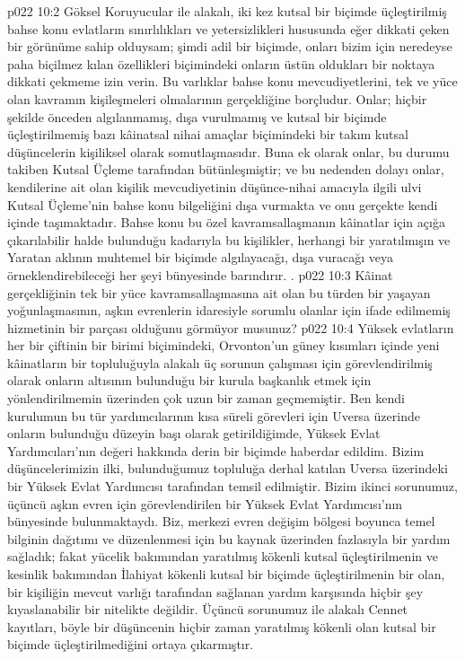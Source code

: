 \vs p022 10:2 Göksel Koruyucular ile alakalı, iki kez kutsal bir biçimde üçleştirilmiş bahse konu evlatların sınırlılıkları ve yetersizlikleri hususunda eğer dikkati çeken bir görünüme sahip olduysam; şimdi adil bir biçimde, onları bizim için neredeyse paha biçilmez kılan özellikleri biçimindeki onların üstün oldukları bir noktaya dikkati çekmeme izin verin. Bu varlıklar bahse konu mevcudiyetlerini, tek ve yüce olan kavramın kişileşmeleri olmalarının gerçekliğine borçludur. Onlar; hiçbir şekilde önceden algılanmamış, dışa vurulmamış ve kutsal bir biçimde üçleştirilmemiş bazı kâinatsal nihai amaçlar biçimindeki bir takım kutsal düşüncelerin kişiliksel olarak somutlaşmasıdır. Buna ek olarak onlar, bu durumu takiben Kutsal Üçleme tarafından bütünleşmiştir; ve bu nedenden dolayı onlar, kendilerine ait olan kişilik mevcudiyetinin düşünce\hyp{}nihai amacıyla ilgili ulvi Kutsal Üçleme’nin bahse konu bilgeliğini dışa vurmakta ve onu gerçekte kendi içinde taşımaktadır. Bahse konu bu özel kavramsallaşmanın kâinatlar için açığa çıkarılabilir halde bulunduğu kadarıyla bu kişilikler, herhangi bir yaratılmışın ve Yaratan aklının muhtemel bir biçimde algılayacağı, dışa vuracağı veya örneklendirebileceği her şeyi bünyesinde barındırır. .
\vs p022 10:3 Kâinat gerçekliğinin tek bir yüce kavramsallaşmasına ait olan bu türden bir yaşayan yoğunlaşmasının, aşkın evrenlerin idaresiyle sorumlu olanlar için ifade edilmemiş hizmetinin bir parçası olduğunu görmüyor musunuz?
\vs p022 10:4 Yüksek evlatların her bir çiftinin bir birimi biçimindeki, Orvonton’un güney kısımları içinde yeni kâinatların bir topluluğuyla alakalı üç sorunun çalışması için görevlendirilmiş olarak onların altısının bulunduğu bir kurula başkanlık etmek için yönlendirilmemin üzerinden çok uzun bir zaman geçmemiştir. Ben kendi kurulumun bu tür yardımcılarının kısa süreli görevleri için Uversa üzerinde onların bulunduğu düzeyin başı olarak getirildiğimde, Yüksek Evlat Yardımcıları’nın değeri hakkında derin bir biçimde haberdar edildim. Bizim düşüncelerimizin ilki, bulunduğumuz topluluğa derhal katılan Uversa üzerindeki bir Yüksek Evlat Yardımcısı tarafından temsil edilmiştir. Bizim ikinci sorunumuz, üçüncü aşkın evren için görevlendirilen bir Yüksek Evlat Yardımcısı’nın bünyesinde bulunmaktaydı. Biz, merkezi evren değişim bölgesi boyunca temel bilginin dağıtımı ve düzenlenmesi için bu kaynak üzerinden fazlasıyla bir yardım sağladık; fakat yücelik bakımından yaratılmış kökenli kutsal üçleştirilmenin ve kesinlik bakımından İlahiyat kökenli kutsal bir biçimde üçleştirilmenin bir  olan, bir kişiliğin mevcut varlığı tarafından sağlanan yardım karşısında hiçbir şey kıyaslanabilir bir nitelikte değildir. Üçüncü sorunumuz ile alakalı Cennet kayıtları, böyle bir düşüncenin hiçbir zaman yaratılmış kökenli olan kutsal bir biçimde üçleştirilmediğini ortaya çıkarmıştır.
